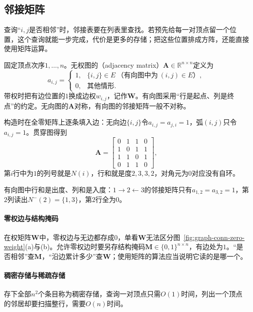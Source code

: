 \subsection{邻接矩阵}
\label{sec:graph-conn-adjacency-matrix}

查询“$i,j$是否相邻”时，邻接表要在列表里查找。若预先给每一对顶点留一个位置，这个查询就能一步完成，代价是更多的存储；把这些位置排成方阵，还能直接使用矩阵运算。

固定顶点次序$1,\ldots,n$。无权图的（adjacency matrix）$\bm A\in\mathbb R^{n\times n}$定义为
\begin{equation}
a_{i,j}=
\begin{cases}
1, & \{i,j\}\in E\ \text{（有向图中为}\ (i,j)\in E\text{）},\\
0, & \text{其他情形}.
\end{cases}
\label{eq:graph-conn-adjacency-matrix}
\end{equation}
带权时把有边位置的$1$换成边权$w_{i,j}$，记作$\bm W$。有向图采用“行是起点、列是终点”的约定。无向图的$\bm A$对称，有向图的邻接矩阵一般不对称。

构造时在全零矩阵上逐条填入边：无向边$\{i,j\}$令$a_{i,j}=a_{j,i}=1$，弧$(i,j)$只令$a_{i,j}=1$。贯穿图得到
\begin{equation}
\bm A=
\begin{bmatrix}
0&1&1&0\\
1&0&1&1\\
1&1&0&1\\
0&1&1&0
\end{bmatrix},
\label{eq:graph-conn-running-adjacency}
\end{equation}
第$i$行中为$1$的列号就是$N(i)$，行和就是度$2,3,3,2$，对角元为$0$对应没有自环。

有向图中行和是出度、列和是入度：$1\to2\leftarrow3$的邻接矩阵只有$a_{1,2}=a_{3,2}=1$，第$2$列读出$N^-(2)=\{1,3\}$，第$2$行全为$0$。

\paragraph{零权边与结构掩码}
在权矩阵$\bm W$中，零权边与无边都存成$0$，单看$\bm W$无法区分图~\ref{fig:graph-conn-zero-weight}(a)与(b)。允许零权边时要另存结构掩码$\bm M\in\{0,1\}^{n\times n}$，有边处为$1$。“是否相邻”查$\bm M$，“沿边累计多少”查$\bm W$；使用矩阵的算法应当说明它读的是哪一个。

\paragraph{稠密存储与稀疏存储}
存下全部$n^2$个条目称为稠密存储，查询一对顶点只需$O(1)$时间，列出一个顶点的邻居却要扫描整行，需要$O(n)$时间。

